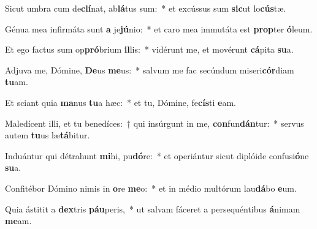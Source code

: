 \item Sicut umbra cum de\textbf{clí}nat, ab\textbf{lá}tus sum:~* et excússus sum \textbf{sic}ut lo\textbf{cús}tæ.
\item Génua mea infirmáta sunt \textbf{a} je\textbf{jú}nio:~* et caro mea immutáta est \textbf{prop}ter \textbf{ó}leum.
\item Et ego factus sum op\textbf{pró}brium \textbf{il}lis:~* vidérunt me, et movérunt \textbf{cá}pita \textbf{su}a.
\item Adjuva me, Dómine, \textbf{De}us \textbf{me}us:~* salvum me fac secúndum miseri\textbf{cór}diam \textbf{tu}am.
\item Et sciant quia \textbf{ma}nus \textbf{tu}a hæc:~* et tu, Dómine, fe\textbf{cís}ti \textbf{e}am.
\item Maledícent illi, et tu benedíces:~† qui insúrgunt in me, \textbf{con}fun\textbf{dán}tur:~* servus autem \textbf{tu}us læ\textbf{tá}bitur.
\item Induántur qui détrahunt \textbf{mi}hi, pu\textbf{dó}re:~* et operiántur sicut diplóide confusi\textbf{ó}ne \textbf{su}a.
\item Confitébor Dómino nimis in \textbf{o}re \textbf{me}o:~* et in médio multórum lau\textbf{dá}bo \textbf{e}um.
\item Quia ástitit a \textbf{dex}tris \textbf{páu}peris,~* ut salvam fáceret a persequéntibus \textbf{á}nimam \textbf{me}am.
